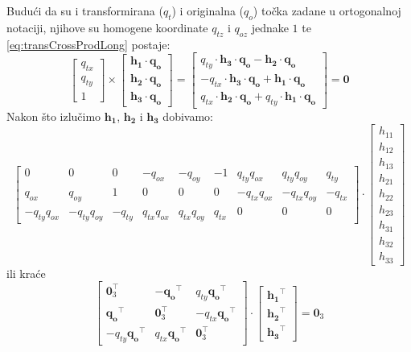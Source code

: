 Budući da su i transformirana ($q_t$) i originalna ($q_o$) točka zadane u ortogonalnoj notaciji, njihove su homogene koordinate $q_{tz}$ i $q_{oz}$ jednake $1$ te \eqref{eq:transCrossProdLong} postaje:
\begin{equation}
\label{eq:transCrossProdDetailed}
\left[
\begin{matrix}
q_{tx} \\
q_{ty} \\
1
\end{matrix}
\right]
\times \left[
\begin{matrix}
\mathbf{h_1} \cdot \mathbf{q_o} \\
\mathbf{h_2} \cdot \mathbf{q_o} \\
\mathbf{h_3} \cdot \mathbf{q_o}
\end{matrix}
\right]
= \left[
\begin{matrix}
q_{ty} \cdot \mathbf{h_3} \cdot \mathbf{q_o} - \mathbf{h_2} \cdot \mathbf{q_o} \\
-q_{tx} \cdot \mathbf{h_3} \cdot \mathbf{q_o} + \mathbf{h_1} \cdot \mathbf{q_o} \\
q_{tx} \cdot \mathbf{h_2} \cdot \mathbf{q_o} + q_{ty} \cdot \mathbf{h_1} \cdot \mathbf{q_o}
\end{matrix}
\right]
= \mathbf{0}
\end{equation}
Nakon što izlučimo $\mathbf{h_1}$, $\mathbf{h_2}$ i $\mathbf{h_3}$ dobivamo:
\begin{equation}
\left[
\begin{matrix}
0 & 0 & 0 & -q_{ox} & -q_{oy} & -1 & q_{ty} q_{ox} & q_{ty} q_{oy} & q_{ty} \\
q_{ox} & q_{oy} & 1 & 0 & 0 & 0 & -q_{tx} q_{ox} & -q_{tx} q_{oy} & -q_{tx} \\
-q_{ty} q_{ox} & -q_{ty} q_{oy} & -q_{ty} & q_{tx} q_{ox} & q_{tx} q_{oy} & q_{tx} & 0 & 0 & 0
\end{matrix}
\right]
\cdot
\left[
\begin{matrix}
h_{11} \\
h_{12} \\
h_{13} \\
h_{21} \\
h_{22} \\
h_{23} \\
h_{31} \\
h_{32} \\
h_{33}
\end{matrix}
\right]
\end{equation}
ili kraće
\begin{equation}
\left[
\begin{matrix}
\mathbf{0}_3^\top & -\mathbf{q_o}^\top & q_{ty} \mathbf{q_o}^\top \\
\mathbf{q_o}^\top & \mathbf{0}_3^\top & -q_{tx} \mathbf{q_o}^\top \\
-q_{ty}\mathbf{q_o}^\top & q_{tx} \mathbf{q_o}^\top & \mathbf{0}_3^\top
\end{matrix}
\right]
\cdot
\left[
\begin{matrix}
\mathbf{h_1}^\top \\
\mathbf{h_2}^\top \\
\mathbf{h_3}^\top
\end{matrix}
\right]
= \mathbf{0}_3
\end{equation}
